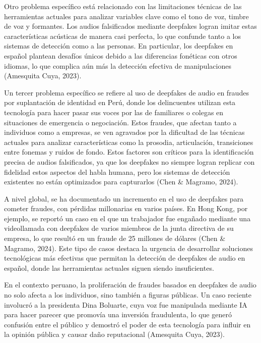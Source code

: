 Otro problema específico está relacionado con las limitaciones técnicas de las herramientas actuales para analizar variables clave como el tono de voz, timbre de voz y formantes. Los audios falsificados mediante deepfakes logran imitar estas características acústicas de manera casi perfecta, lo que confunde tanto a los sistemas de detección como a las personas. En particular, los deepfakes en español plantean desafíos únicos debido a las diferencias fonéticas con otros idiomas, lo que complica aún más la detección efectiva de manipulaciones (Amesquita Cuya, 2023).

Un tercer problema específico se refiere al uso de deepfakes de audio en fraudes por suplantación de identidad en Perú, donde los delincuentes utilizan esta tecnología para hacer pasar sus voces por las de familiares o colegas en situaciones de emergencia o negociación. Estos fraudes, que afectan tanto a individuos como a empresas, se ven agravados por la dificultad de las técnicas actuales para analizar características como la prosodia, articulación, transiciones entre fonemas y ruidos de fondo. Estos factores son críticos para la identificación precisa de audios falsificados, ya que los deepfakes no siempre logran replicar con fidelidad estos aspectos del habla humana, pero los sistemas de detección existentes no están optimizados para capturarlos (Chen \& Magramo, 2024).

A nivel global, se ha documentado un incremento en el uso de deepfakes para cometer fraudes, con pérdidas millonarias en varios países. En Hong Kong, por ejemplo, se reportó un caso en el que un trabajador fue engañado mediante una videollamada con deepfakes de varios miembros de la junta directiva de su empresa, lo que resultó en un fraude de 25 millones de dólares (Chen \& Magramo, 2024). Este tipo de casos destaca la urgencia de desarrollar soluciones tecnológicas más efectivas que permitan la detección de deepfakes de audio en español, donde las herramientas actuales siguen siendo insuficientes.

En el contexto peruano, la proliferación de fraudes basados en deepfakes de audio no solo afecta a los individuos, sino también a figuras públicas. Un caso reciente involucró a la presidenta Dina Boluarte, cuya voz fue manipulada mediante IA para hacer parecer que promovía una inversión fraudulenta, lo que generó confusión entre el público y demostró el poder de esta tecnología para influir en la opinión pública y causar daño reputacional (Amesquita Cuya, 2023).

